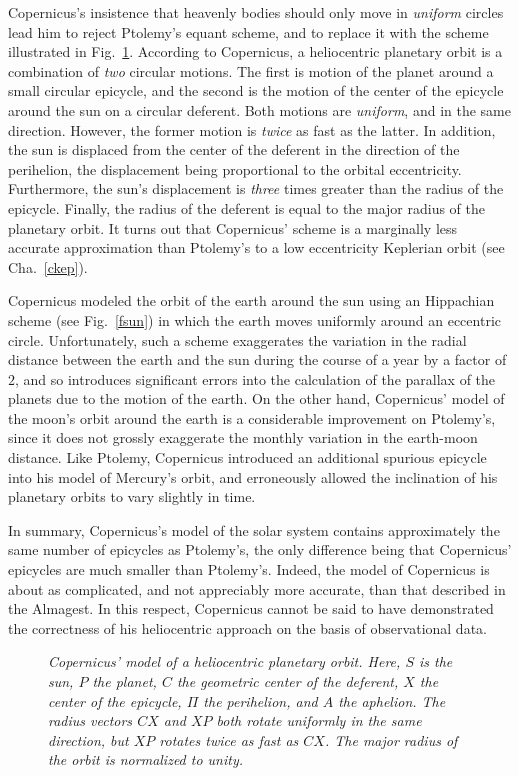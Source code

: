Copernicus's insistence that heavenly bodies should only move in {\em uniform}\/
circles lead him to reject Ptolemy's  equant scheme, and to  replace
it with the scheme illustrated in Fig.~\ref{fplan}. According to Copernicus, a heliocentric
planetary orbit is a combination of {\em two}\/ circular motions. The first is 
motion of the planet around a small circular epicycle, and the second is the motion of the center of
the epicycle around the sun on  a circular deferent. Both motions are {\em uniform}, and in the same direction.
However, the former motion is {\em twice}\/ as fast as the latter. In addition, the sun is displaced
from the center of the deferent in the direction of the perihelion, the displacement being
proportional to the orbital eccentricity. Furthermore, the sun's displacement
is {\em three}\/ times greater than the radius of the epicycle. Finally, the
radius of the deferent is equal to the major radius of the planetary orbit. It turns
out that Copernicus' scheme is a marginally less accurate approximation  than Ptolemy's to 
a low eccentricity Keplerian orbit (see Cha.~\ref{ckep}). 

Copernicus modeled the
orbit of the earth around the sun using an Hippachian scheme (see Fig.~\ref{fsun}) in which the earth moves
uniformly around an eccentric circle.  Unfortunately, such a scheme exaggerates the variation in the
radial distance between the earth and the sun during the course of a year by a factor of $2$, and so
introduces significant errors into the calculation of the parallax of the planets due to the motion of the earth. 
On the other hand, Copernicus' model of the moon's orbit around the earth is a considerable improvement on Ptolemy's, since
it does not grossly exaggerate the monthly variation in the earth-moon distance. 
Like Ptolemy, Copernicus  introduced an additional spurious epicycle into his model
of Mercury's orbit, and erroneously allowed the
inclination of his planetary orbits to vary slightly   in time. 

In summary, Copernicus's model of the solar system contains approximately the 
 same number of epicycles as Ptolemy's, the only difference being that Copernicus' epicycles are much 
 smaller than Ptolemy's.  Indeed, the model of Copernicus is about as complicated, and not appreciably more accurate, than that described in the  Almagest. 
In this respect, Copernicus cannot be said to have demonstrated
the correctness of his heliocentric approach on the basis of observational data. 

\begin{figure}
\centerline{}
\caption{\em Copernicus' model of a heliocentric planetary orbit. Here, $S$ is the sun, $P$ the planet, $C$ the geometric center of the deferent, $X$ the center of the epicycle, $\Pi$ the perihelion, and $A$ the aphelion. The radius vectors $CX$ and $XP$ both rotate uniformly in the
same direction,
but $XP$ rotates twice as fast as $CX$. The major radius of the orbit is normalized to unity.}\label{fplan}   
\end{figure}

